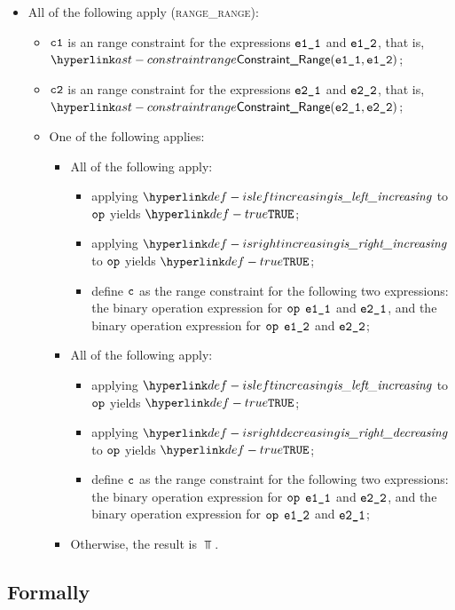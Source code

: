 \begin{itemize}
  \item All of the following apply (\textsc{range\_range}):
  \begin{itemize}
    \item $\vcone$ is an range constraint for the expressions $\veoneone$ and $\veonetwo$, that is, \\ $\ConstraintRange(\veoneone, \veonetwo)$;
    \item $\vctwo$ is an range constraint for the expressions $\vetwoone$ and $\vetwotwo$, that is, \\ $\ConstraintRange(\vetwoone, \vetwotwo)$;
    \item One of the following applies:
    \begin{itemize}
      \item All of the following apply:
      \begin{itemize}
        \item applying $\isleftincreasing$ to $\op$ yields $\True$;
        \item applying $\isrightincreasing$ to $\op$ yields $\True$;
        \item define $\vc$ as the range constraint for the following two expressions:
              the binary operation expression for $\op$ $\veoneone$ and $\vetwoone$, and
              the binary operation expression for $\op$ $\veonetwo$ and $\vetwotwo$;
      \end{itemize}
      \item All of the following apply:
      \begin{itemize}
        \item applying $\isleftincreasing$ to $\op$ yields $\True$;
        \item applying $\isrightdecreasing$ to $\op$ yields $\True$;
        \item define $\vc$ as the range constraint for the following two expressions:
              the binary operation expression for $\op$ $\veoneone$ and $\vetwotwo$, and
              the binary operation expression for $\op$ $\veonetwo$ and $\vetwoone$;
      \end{itemize}
      \item Otherwise, the result is $\Top$.
    \end{itemize}
  \end{itemize}
\end{itemize}

\subsection{Formally}
\begin{mathpar}
\end{mathpar}

